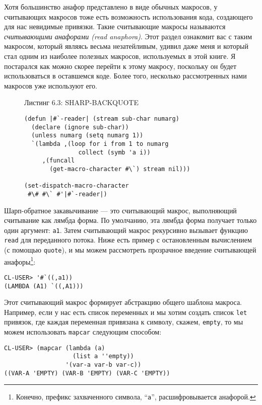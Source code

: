 Хотя большинство анафор представлено в виде обычных макросов, у считывающих макросов тоже есть возможность использования кода, создающего для нас невидимые привязки. Такие считывающие макросы называются \emph{считывающими анафорами (read anaphora)}. Этот раздел ознакомит вас с таким макросом, который являясь весьма незатейливым, удивил даже меня и который стал одним из наиболее полезных макросов, используемых в этой книге. Я постарался как можно скорее перейти к этому макросу, поскольку он будет использоваться в оставшемся коде. Более того, несколько рассмотренных нами макросов уже используют его.

\begin{figure}Листинг 6.3: SHARP-BACKQUOTE\label{listing_6.3}
\listbegin
\begin{verbatim}
(defun |#`-reader| (stream sub-char numarg)
  (declare (ignore sub-char))
  (unless numarg (setq numarg 1))
  `(lambda ,(loop for i from 1 to numarg
               collect (symb 'a i))
     ,(funcall
       (get-macro-character #\`) stream nil)))

(set-dispatch-macro-character
 #\# #\` #'|#`-reader|)
\end{verbatim}
\listend
\end{figure}

Шарп-обратное закавычивание --- это считывающий макрос, выполняющий считывание как лямбда форма. По умолчанию, эта лямбда форма получает только один аргумент: \verb"a1". Затем считывающий макрос рекурсивно вызывает функцию \verb"read" для переданного потока. Ниже есть пример с остановленным вычислением (с помощью \verb"quote"), и мы можем рассмотреть прозрачное введение считывающей анафоры\footnote{Конечно, префикс захваченного символа, ``\verb"a"'', расшифровывается анафорой.}:



\begin{verbatim}
CL-USER> '#`((,a1))
(LAMBDA (A1) `((,A1)))
\end{verbatim}

Этот считывающий макрос формирует абстракцию общего шаблона макроса. Например, если у нас есть список переменных и мы хотим создать список \verb"let" привязок, где каждая переменная привязана к символу, скажем, \verb"empty", то мы можем использовать \verb"mapcar" следующим способом:

\begin{verbatim}
CL-USER> (mapcar (lambda (a)
                   (list a ''empty))
                 '(var-a var-b var-c))
((VAR-A 'EMPTY) (VAR-B 'EMPTY) (VAR-C 'EMPTY))
\end{verbatim}

